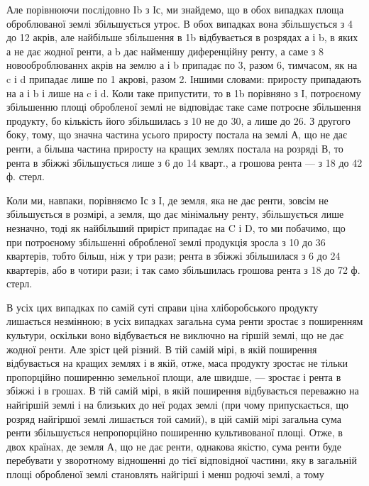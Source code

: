 Але порівнюючи послідовно Іb з Іс, ми знайдемо, що в обох випадках площа
оброблюваної землі збільшується утроє. В обох випадках вона збільшується з
4 до 12 акрів, але найбільше збільшення в 1b відбувається в розрядах
а і b, в яких а не дає жодної ренти, а b дає найменшу
диференційну ренту, а саме з 8 новооброблюваннх акрів на землю а і b
припадає по 3, разом 6, тимчасом,
як на c і d припадає лише по 1 акрові, разом 2. Іншими словами:  приросту
припадають на а і b і лише  на c і d. Коли таке припустити, то в
1b порівняно з І, потроєному збільшенню площі обробленої землі не відповідає
таке саме потроєне збільшення продукту, бо кількість його збільшилась з 10
не до 30, а лише до 26. З другого боку, тому, що значна частина усього приросту
постала на землі А, що не дає ренти, а більша частина приросту на
кращих землях постала на розряді В, то рента в збіжжі збільшується лише
з 6 до 14 кварт., а грошова рента — з 18 до 42 ф. стерл.

Коли ми, навпаки, порівняємо Іс з І, де земля, яка не дає ренти, зовсім
не збільшується в розмірі, а земля, що дає мінімальну ренту, збільшується
лише незначно, тоді як найбільший приріст припадає на C і D, то ми побачимо,
що при потроєному збільшенні обробленої землі продукція зросла з 10 до
36 квартерів, тобто більш, ніж у три рази; рента в збіжжі збільшилася з 6 до
24 квартерів, або в чотири рази; і так само збільшилась грошова рента
з 18 до 72 ф. стерл.

В усіх цих випадках по самій суті справи ціна хліборобського продукту
лишається незмінною; в усіх випадках загальна сума ренти зростає з поширенням
культури, оскільки воно відбувається не виключно на гіршій землі, що
не дає жодної ренти. Але зріст цей різний. В тій самій мірі, в якій поширення
відбувається на кращих землях і в якій, отже, маса продукту зростає не тільки
пропорційно поширенню земельної площи, але швидше, — зростає і рента в
збіжжі і в грошах. В тій самій мірі, в якій поширення відбувається переважно
на найгіршій землі і на близьких до неї родах землі (при чому припускається,
що розряд найгіршої землі лишається той самий), в цій самій мірі загальна
сума ренти збільшується непропорційно поширенню культивованої площі. Отже,
в двох країнах, де земля А, що не дає ренти, однакова якістю, сума ренти
буде перебувати у зворотному відношенні до тієї відповідної частини, яку в загальній
площі обробленої землі становлять найгірші і менш родючі землі, а тому

\parbreak{}  %
